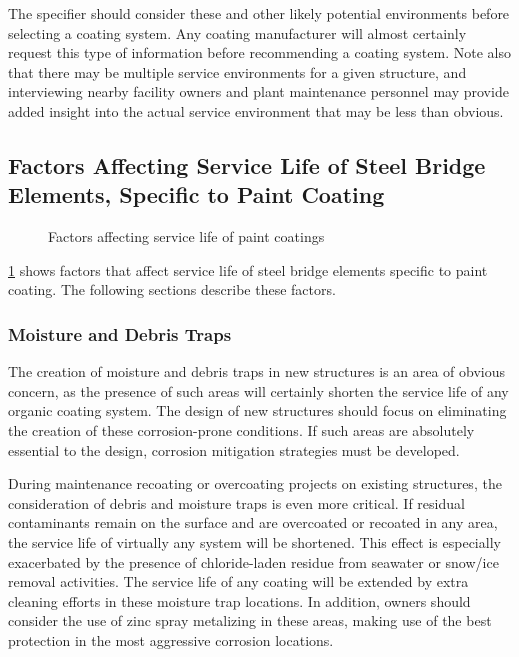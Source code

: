The specifier should consider these and other likely potential environments before selecting a coating system.
Any coating manufacturer will almost certainly request this type of information before recommending a coating
system. Note also that there may be multiple service environments for a given structure, and interviewing nearby
facility owners and plant maintenance personnel may provide added insight into the actual service environment that
may be less than obvious.

\subsection{Factors Affecting Service Life of Steel Bridge Elements, Specific to Paint Coating}

\begin{figure}
  \caption{Factors affecting service life of paint coatings}
  \label{fig:faulttree-paint-coatings}
\end{figure}

\cref{fig:faulttree-paint-coatings} shows factors that affect service life of steel bridge elements specific to paint coating. The following
sections describe these factors.

\subsubsection{Moisture and Debris Traps}
The creation of moisture and debris traps in new structures is an area of obvious concern, as the presence of such
areas will certainly shorten the service life of any organic coating system. The design of new structures should focus
on eliminating the creation of these corrosion-prone conditions. If such areas are absolutely essential to the design,
corrosion mitigation strategies must be developed.

During maintenance recoating or overcoating projects on existing structures, the consideration of debris and
moisture traps is even more critical. If residual contaminants remain on the surface and are overcoated or recoated in
any area, the service life of virtually any system will be shortened. This effect is especially exacerbated by the presence of chloride-laden residue from seawater or snow/ice removal activities. The service life of any coating will
be extended by extra cleaning efforts in these moisture trap locations. In addition, owners should consider the use of
zinc spray metalizing in these areas, making use of the best protection in the most aggressive corrosion locations.


